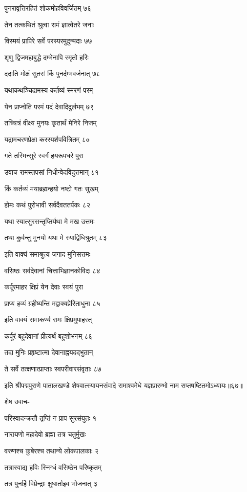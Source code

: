 पुनरावृत्तिरहितं शोकमोहविवर्जितम् ७६

तेन तत्कथितं श्रुत्वा रामं ज्ञात्वेतरे जनाः

विस्मयं प्रापिरे सर्वे परस्परमुदुन्मदाः ७७

शृणु द्विजमहाबुद्धे दम्भेनापि स्मृतो हरिः

ददाति मोक्षं सुतरां किं पुनर्दम्भवर्जनात् ७८

यथाकथञ्चिद्रामस्य कर्तव्यं स्मरणं परम्

येन प्राप्नोति परमं पदं देवादिदुर्लभम् ७९

तच्चित्रं वीक्ष्य मुनयः कृतार्थं मेनिरे निजम्

यद्रामचरणप्रेक्षा करस्पर्शपवित्रितम् ८०

गते तस्मिन्सुरे स्वर्गं हयरूपधरे पुरा

उवाच रामस्तपसां निधीन्वेदविदुत्तमान् ८१

किं कर्तव्यं मयाब्रह्मन्हयो नष्टो गतः सुखम्

होमः कथं पुरोभावी सर्वदैवततर्पकः ८२

यथा स्यात्सुरसन्तृप्तिर्यथा मे मख उत्तमः

तथा कुर्वन्तु मुनयो यथा मे स्याद्विधिश्रुतम् ८३

इति वाक्यं समाश्रुत्य जगाद मुनिसत्तमः

वसिष्ठः सर्वदेवानां चित्ताभिज्ञानकोविदः ८४

कर्पूरमाहर क्षिप्रं येन देवाः स्वयं पुरा

प्राप्य हव्यं ग्रहीष्यन्ति मद्वाक्यप्रेरिताधुना ८५

इति वाक्यं समाकर्ण्य रामः क्षिप्रमुपाहरत्

कर्पूरं बहुदेवानां प्रीत्यर्थं बहुशोभनम् ८६

तदा मुनिः प्रहृष्टात्मा देवानाह्वयदद्भुतान्

ते सर्वे तत्क्षणात्प्राप्ताः स्वपरीवारसंवृताः ८७

इति श्रीपद्मपुराणे पातालखण्डे शेषवात्स्यायनसंवादे रामाश्वमेधे यज्ञप्रारम्भो नाम सप्तषष्टितमोऽध्यायः॥६७॥


शेष उवाच-

परिस्वादन्क्रतौ तृप्तिं न प्राप सुरसंयुतः १

नारायणो महादेवो ब्रह्मा तत्र चतुर्मुखः

वरुणश्च कुबेरश्च तथान्ये लोकपालकाः २

तत्रास्वाद्य हविः स्निग्धं वसिष्ठेन परिष्कृतम्

तत्र पुनर्हि विप्रेन्द्राः क्षुधार्ताइव भोजनात् ३

